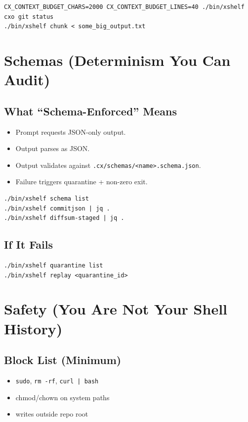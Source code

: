 \documentclass[11pt]{article}
\begin{document}
\begin{lstlisting}[style=cx]
CX_CONTEXT_BUDGET_CHARS=2000 CX_CONTEXT_BUDGET_LINES=40 ./bin/xshelf cxo git status
./bin/xshelf chunk < some_big_output.txt
\end{lstlisting}

\section{Schemas (Determinism You Can Audit)}
\subsection*{What ``Schema-Enforced'' Means}
\begin{itemize}
  \item Prompt requests JSON-only output.
  \item Output parses as JSON.
  \item Output validates against \texttt{.cx/schemas/<name>.schema.json}.
  \item Failure triggers quarantine + non-zero exit.
\end{itemize}

\begin{lstlisting}[style=cx]
./bin/xshelf schema list
./bin/xshelf commitjson | jq .
./bin/xshelf diffsum-staged | jq .
\end{lstlisting}

\subsection*{If It Fails}
\begin{lstlisting}[style=cx]
./bin/xshelf quarantine list
./bin/xshelf replay <quarantine_id>
\end{lstlisting}

\section{Safety (You Are Not Your Shell History)}
\subsection*{Block List (Minimum)}
\begin{itemize}
  \item \texttt{sudo}, \texttt{rm -rf}, \texttt{curl | bash}
  \item chmod/chown on system paths
  \item writes outside repo root
\end{itemize}
\end{document}
